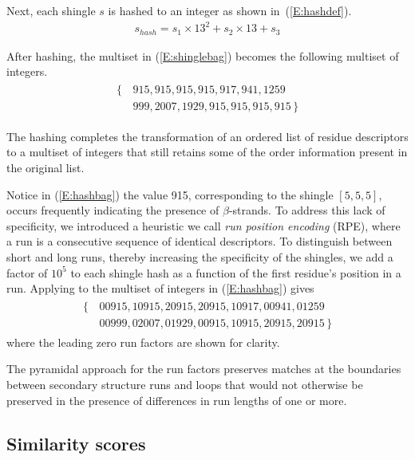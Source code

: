 \documentclass[10pt,letterpaper]{article}
\begin{document}
Next, each shingle $s$ is hashed to an integer as shown in~(\ref{E:hashdef}). 
\begin{gather}\label{E:hashdef}
    s_{hash} = s_1 \times 13^2 + s_2 \times 13 + s_3
\end{gather}

After hashing, the multiset in (\ref{E:shinglebag}) becomes the following multiset of integers.
\begin{align}\label{E:hashbag}
    \begin{split}
    \{\,&915, 915, 915, 915, 917, 941, 1259 \\
        &999, 2007, 1929, 915, 915, 915, 915 \,\}
    \end{split}
\end{align}

The hashing completes the transformation of an ordered list of residue descriptors to a multiset of integers that still retains some of the order information present in the original list. 

Notice in (\ref{E:hashbag}) the value 915, corresponding to the shingle $[ 5, 5, 5 ]$, occurs frequently indicating the presence of $\beta$-strands. 
To address this lack of specificity, we introduced a heuristic we call \emph{run position encoding} (RPE), where a run is a consecutive sequence of identical descriptors. 
To distinguish between short and long runs, thereby increasing the specificity of the shingles, we add a factor of $10^5$ to each shingle hash as a function of the first residue's position in a run. 
Applying to the multiset of integers in (\ref{E:hashbag}) gives
\begin{align}\label{E:rpebag}
    \begin{split}
    \{\,&00915, 10915, 20915, 20915, 10917, 00941, 01259 \\
        &00999, 02007, 01929, 00915, 10915, 20915, 20915 \,\}
    \end{split}
\end{align}
where the leading zero run factors are shown for clarity. 

The pyramidal approach for the run factors preserves matches at the boundaries between secondary structure runs and loops that would not otherwise be preserved in the presence of differences in run lengths of one or more. 

\subsection*{Similarity scores}
\end{document}

